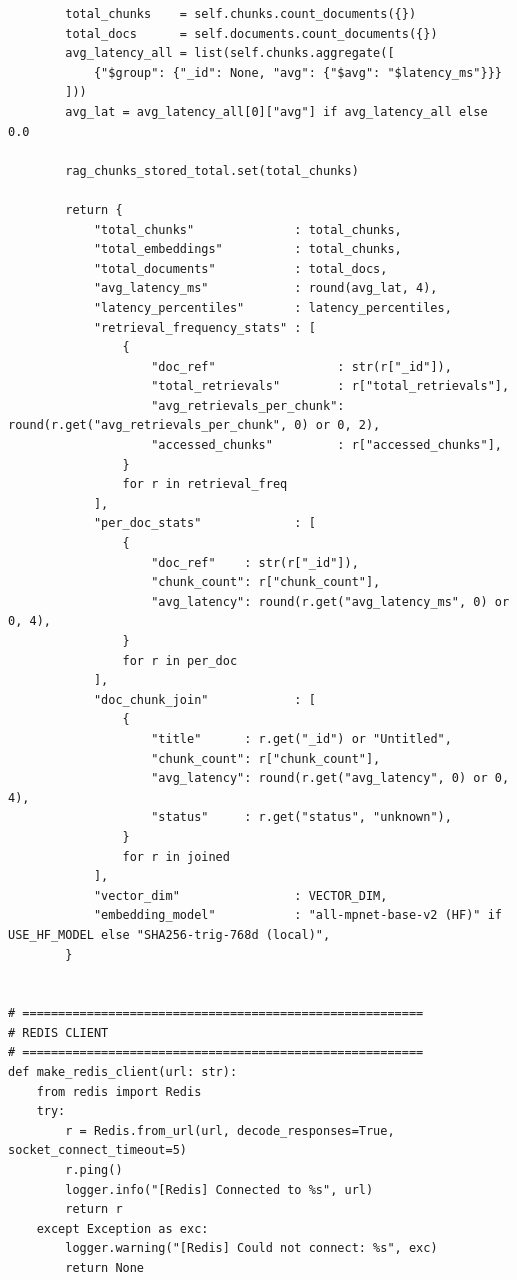 \documentclass[12pt,a4paper]{report}
\begin{document}
\begin{lstlisting}
        total_chunks    = self.chunks.count_documents({})
        total_docs      = self.documents.count_documents({})
        avg_latency_all = list(self.chunks.aggregate([
            {"$group": {"_id": None, "avg": {"$avg": "$latency_ms"}}}
        ]))
        avg_lat = avg_latency_all[0]["avg"] if avg_latency_all else 0.0

        rag_chunks_stored_total.set(total_chunks)

        return {
            "total_chunks"              : total_chunks,
            "total_embeddings"          : total_chunks,
            "total_documents"           : total_docs,
            "avg_latency_ms"            : round(avg_lat, 4),
            "latency_percentiles"       : latency_percentiles,
            "retrieval_frequency_stats" : [
                {
                    "doc_ref"                 : str(r["_id"]),
                    "total_retrievals"        : r["total_retrievals"],
                    "avg_retrievals_per_chunk": round(r.get("avg_retrievals_per_chunk", 0) or 0, 2),
                    "accessed_chunks"         : r["accessed_chunks"],
                }
                for r in retrieval_freq
            ],
            "per_doc_stats"             : [
                {
                    "doc_ref"    : str(r["_id"]),
                    "chunk_count": r["chunk_count"],
                    "avg_latency": round(r.get("avg_latency_ms", 0) or 0, 4),
                }
                for r in per_doc
            ],
            "doc_chunk_join"            : [
                {
                    "title"      : r.get("_id") or "Untitled",
                    "chunk_count": r["chunk_count"],
                    "avg_latency": round(r.get("avg_latency", 0) or 0, 4),
                    "status"     : r.get("status", "unknown"),
                }
                for r in joined
            ],
            "vector_dim"                : VECTOR_DIM,
            "embedding_model"           : "all-mpnet-base-v2 (HF)" if USE_HF_MODEL else "SHA256-trig-768d (local)",
        }


# ========================================================
# REDIS CLIENT
# ========================================================
def make_redis_client(url: str):
    from redis import Redis
    try:
        r = Redis.from_url(url, decode_responses=True, socket_connect_timeout=5)
        r.ping()
        logger.info("[Redis] Connected to %s", url)
        return r
    except Exception as exc:
        logger.warning("[Redis] Could not connect: %s", exc)
        return None



\end{lstlisting}
\end{document}
